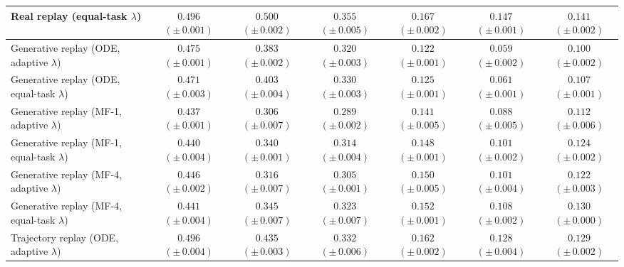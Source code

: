 \begin{table}[t]
{\begin{tabular}{@{}lcccccc@{}}
\rowcolor{referencerow} Real replay (equal-task $\lambda$) & $0.496$ {\scriptsize $(\pm\,0.001)$} & $0.500$ {\scriptsize $(\pm\,0.002)$} & $0.355$ {\scriptsize $(\pm\,0.005)$} & $0.167$ {\scriptsize $(\pm\,0.002)$} & $0.147$ {\scriptsize $(\pm\,0.001)$} & $0.141$ {\scriptsize $(\pm\,0.002)$} \\
\midrule
Generative replay (ODE, adaptive $\lambda$) & $0.475$ {\scriptsize $(\pm\,0.001)$} & $0.383$ {\scriptsize $(\pm\,0.002)$} & $0.320$ {\scriptsize $(\pm\,0.003)$} & $0.122$ {\scriptsize $(\pm\,0.001)$} & $0.059$ {\scriptsize $(\pm\,0.002)$} & $0.100$ {\scriptsize $(\pm\,0.002)$} \\
Generative replay (ODE, equal-task $\lambda$) & $0.471$ {\scriptsize $(\pm\,0.003)$} & $0.403$ {\scriptsize $(\pm\,0.004)$} & $0.330$ {\scriptsize $(\pm\,0.003)$} & $0.125$ {\scriptsize $(\pm\,0.001)$} & $0.061$ {\scriptsize $(\pm\,0.001)$} & $0.107$ {\scriptsize $(\pm\,0.001)$} \\
Generative replay (MF-1, adaptive $\lambda$) & $0.437$ {\scriptsize $(\pm\,0.001)$} & $0.306$ {\scriptsize $(\pm\,0.007)$} & $0.289$ {\scriptsize $(\pm\,0.002)$} & $0.141$ {\scriptsize $(\pm\,0.005)$} & $0.088$ {\scriptsize $(\pm\,0.005)$} & $0.112$ {\scriptsize $(\pm\,0.006)$} \\
Generative replay (MF-1, equal-task $\lambda$) & $0.440$ {\scriptsize $(\pm\,0.004)$} & $0.340$ {\scriptsize $(\pm\,0.001)$} & $0.314$ {\scriptsize $(\pm\,0.004)$} & $0.148$ {\scriptsize $(\pm\,0.001)$} & $0.101$ {\scriptsize $(\pm\,0.002)$} & $0.124$ {\scriptsize $(\pm\,0.002)$} \\
Generative replay (MF-4, adaptive $\lambda$) & $0.446$ {\scriptsize $(\pm\,0.002)$} & $0.316$ {\scriptsize $(\pm\,0.007)$} & $0.305$ {\scriptsize $(\pm\,0.001)$} & $0.150$ {\scriptsize $(\pm\,0.005)$} & $0.101$ {\scriptsize $(\pm\,0.004)$} & $0.122$ {\scriptsize $(\pm\,0.003)$} \\
Generative replay (MF-4, equal-task $\lambda$) & $0.441$ {\scriptsize $(\pm\,0.004)$} & $0.345$ {\scriptsize $(\pm\,0.007)$} & $0.323$ {\scriptsize $(\pm\,0.007)$} & $0.152$ {\scriptsize $(\pm\,0.001)$} & $0.108$ {\scriptsize $(\pm\,0.002)$} & $0.130$ {\scriptsize $(\pm\,0.000)$} \\
\midrule
\rowcolor{trajectoryrow} Trajectory replay (ODE, adaptive $\lambda$) & $0.496$ {\scriptsize $(\pm\,0.004)$} & $0.435$ {\scriptsize $(\pm\,0.003)$} & $0.332$ {\scriptsize $(\pm\,0.006)$} & $0.162$ {\scriptsize $(\pm\,0.002)$} & $0.128$ {\scriptsize $(\pm\,0.004)$} & $0.129$ {\scriptsize $(\pm\,0.002)$} \\

\end{tabular}}
\end{table}
